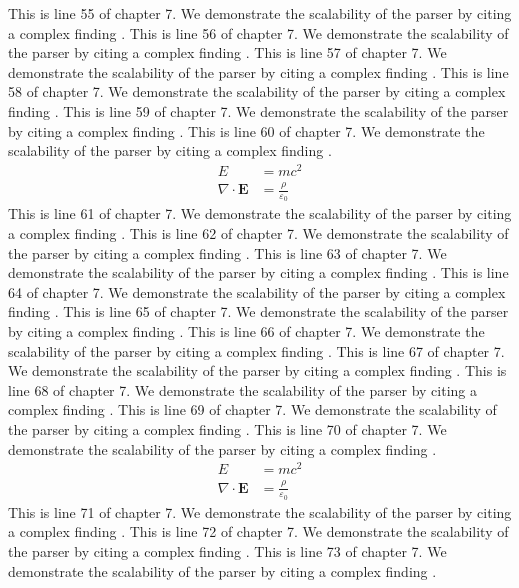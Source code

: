 This is line 55 of chapter 7. We demonstrate the scalability of the parser by citing a complex finding \cite{ref7_55}.
This is line 56 of chapter 7. We demonstrate the scalability of the parser by citing a complex finding \cite{ref7_56}.
This is line 57 of chapter 7. We demonstrate the scalability of the parser by citing a complex finding \cite{ref7_57}.
This is line 58 of chapter 7. We demonstrate the scalability of the parser by citing a complex finding \cite{ref7_58}.
This is line 59 of chapter 7. We demonstrate the scalability of the parser by citing a complex finding \cite{ref7_59}.
This is line 60 of chapter 7. We demonstrate the scalability of the parser by citing a complex finding \cite{ref7_60}.
\begin{align*}
  E &= mc^2 \\
  \nabla \cdot \mathbf{E} &= \frac{\rho}{\varepsilon_0}
\end{align*}
This is line 61 of chapter 7. We demonstrate the scalability of the parser by citing a complex finding \cite{ref7_61}.
This is line 62 of chapter 7. We demonstrate the scalability of the parser by citing a complex finding \cite{ref7_62}.
This is line 63 of chapter 7. We demonstrate the scalability of the parser by citing a complex finding \cite{ref7_63}.
This is line 64 of chapter 7. We demonstrate the scalability of the parser by citing a complex finding \cite{ref7_64}.
This is line 65 of chapter 7. We demonstrate the scalability of the parser by citing a complex finding \cite{ref7_65}.
This is line 66 of chapter 7. We demonstrate the scalability of the parser by citing a complex finding \cite{ref7_66}.
This is line 67 of chapter 7. We demonstrate the scalability of the parser by citing a complex finding \cite{ref7_67}.
This is line 68 of chapter 7. We demonstrate the scalability of the parser by citing a complex finding \cite{ref7_68}.
This is line 69 of chapter 7. We demonstrate the scalability of the parser by citing a complex finding \cite{ref7_69}.
This is line 70 of chapter 7. We demonstrate the scalability of the parser by citing a complex finding \cite{ref7_70}.
\begin{align*}
  E &= mc^2 \\
  \nabla \cdot \mathbf{E} &= \frac{\rho}{\varepsilon_0}
\end{align*}
This is line 71 of chapter 7. We demonstrate the scalability of the parser by citing a complex finding \cite{ref7_71}.
This is line 72 of chapter 7. We demonstrate the scalability of the parser by citing a complex finding \cite{ref7_72}.
This is line 73 of chapter 7. We demonstrate the scalability of the parser by citing a complex finding \cite{ref7_73}.
